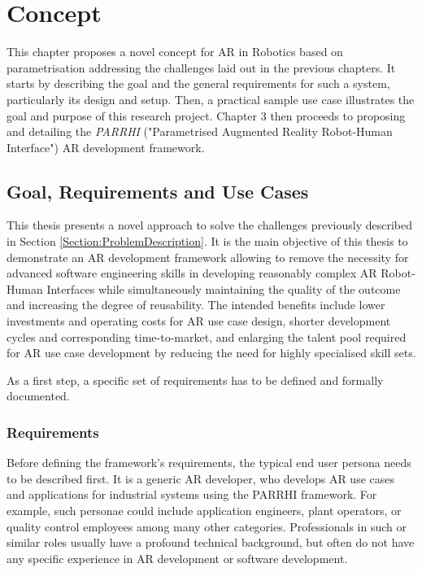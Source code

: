 \chapter{Concept}\label{Chap:Concept}

This chapter proposes a novel concept for AR in Robotics based on parametrisation addressing the challenges laid out in the previous chapters. It starts by describing the goal and the general requirements for such a system, particularly its design and setup. Then, a  practical sample use case illustrates the goal and purpose of this research project. Chapter 3 then proceeds to proposing and detailing the \textit{PARRHI} ("Parametrised Augmented Reality Robot-Human Interface")  AR development framework.

\section{Goal, Requirements and Use Cases}
This thesis presents a novel approach to solve the challenges previously described in Section \ref{Section:ProblemDescription}. It is the main objective of this thesis to demonstrate an AR development framework allowing to remove the necessity for advanced software engineering skills in developing reasonably complex AR Robot-Human Interfaces while simultaneously maintaining the quality of the outcome and increasing the degree of reusability. The intended benefits include lower investments and operating costs for AR use case design, shorter development cycles and corresponding time-to-market, and enlarging the talent pool required for AR use case development by reducing the need for highly specialised skill sets.

As a first step, a specific set of requirements has to be defined and formally documented.

\subsection{Requirements}\label{Section:Requirements}

Before defining the framework’s requirements, the typical end user persona needs to be described first. It is a generic AR developer, who develops AR use cases and applications for industrial systems using the PARRHI framework. For example, such personae could include application engineers, plant operators, or quality control employees among many other categories. Professionals in such or similar roles usually have a profound technical background, but often do not have any specific experience in AR development or software development.


